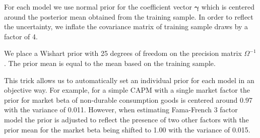 For each model we use normal prior for the coefficient vector $\boldsymbol{\gamma}$ which is centered around the posterior mean obtained from the training sample.
In order to reflect the uncertainty, we inflate the covariance matrix of training sample draws by a factor of 4.

We place a Wishart prior with 25 degrees of freedom on the precision matrix $\Omega^{-1}$.
The prior mean is equal to the mean based on the training sample. 

This trick allows us to automatically set an individual prior for each model in an objective way. 
For example, for a simple CAPM with a single market factor  the prior for market beta of non-durable consumption goods is centered around 0.97 with the variance of 0.011.
However, when estimating Fama-French 3 factor model the prior is adjusted to reflect the presence of two other factors with the prior mean for the market beta being shifted to 1.00 with the variance of 0.015.
